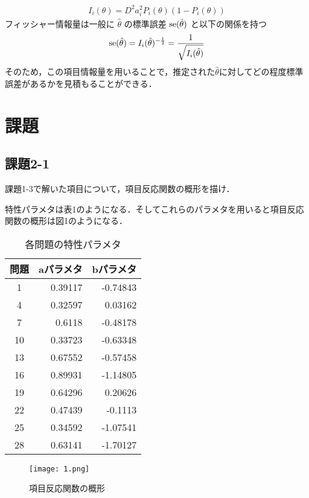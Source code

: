 \documentclass[12pt]{jarticle}
\begin{document}
\begin{eqnarray}
    I_i(\theta)=D^2a_i^2 P_i(\theta)(1-P_i(\theta))
\end{eqnarray}
フィッシャー情報量は一般に
$\hat{\theta}$
の標準誤差
${\rm se}(\hat{\theta})$
と以下の関係を持つ
\begin{eqnarray}
    {\rm se}(\hat{\theta})=I_i(\hat{\theta})^{-\frac{1}{2}}=\frac{1}{\sqrt{I_i(\hat{\theta})}}
\end{eqnarray}
そのため，この項目情報量を用いることで，推定された$\hat{\theta}$に対してどの程度標準誤差があるかを見積もることができる．
\section{課題}
\subsection{課題2-1}
\begin{shadebox}
    \quad 課題1-3で解いた項目について，項目反応関数の概形を描け．
\end{shadebox}
\vspace{\baselineskip}
特性パラメタは表1のようになる．そしてこれらのパラメタを用いると項目反応関数の概形は図1のようになる．
\begin{table}[h]
    \centering
    \caption{各問題の特性パラメタ}
    \begin{tabular}{|c|r|r|} \hline
        問題 & \multicolumn{1}{|c|}{aパラメタ} & \multicolumn{1}{|c|}{bパラメタ} \\
        \hline\hline
        1    & 0.39117                         & -0.74843                        \\ \hline
        4    & 0.32597                         & 0.03162                         \\ \hline
        7    & 0.6118                          & -0.48178                        \\ \hline
        10   & 0.33723                         & -0.63348                        \\ \hline
        13   & 0.67552                         & -0.57458                        \\ \hline
        16   & 0.89931                         & -1.14805                        \\ \hline
        19   & 0.64296                         & 0.20626                         \\ \hline
        22   & 0.47439                         & -0.1113                         \\ \hline
        25   & 0.34592                         & -1.07541                        \\ \hline
        28   & 0.63141                         & -1.70127                        \\ \hline
    \end{tabular}
\end{table}
\begin{figure}[h]
    \begin{center}
        \texttt{[image: 1.png]}
    \end{center}
    \caption{項目反応関数の概形}
    \label{fig1}
\end{figure}
\end{document}
